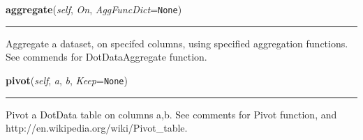 \hspace{.8\funcindent}\begin{boxedminipage}{\funcwidth}

    \raggedright \textbf{aggregate}(\textit{self}, \textit{On}, \textit{AggFuncDict}={\tt None})

    \vspace{-1.5ex}

    \rule{\textwidth}{0.5\fboxrule}
\setlength{\parskip}{2ex}
    Aggregate a dataset, on specifed columns, using specified aggregation 
    functions.  See commends for DotDataAggregate function.

\setlength{\parskip}{1ex}
    \end{boxedminipage}

    \label{Classes:DotData:DotData:pivot}

    \vspace{0.5ex}

\hspace{.8\funcindent}\begin{boxedminipage}{\funcwidth}

    \raggedright \textbf{pivot}(\textit{self}, \textit{a}, \textit{b}, \textit{Keep}={\tt None})

    \vspace{-1.5ex}

    \rule{\textwidth}{0.5\fboxrule}
\setlength{\parskip}{2ex}
    Pivot a DotData table  on columns a,b. See comments for Pivot function,
    and http://en.wikipedia.org/wiki/Pivot\_table.

\setlength{\parskip}{1ex}
    \end{boxedminipage}

    \label{Classes:DotData:DotData:aggregate_in}

    \vspace{0.5ex}

